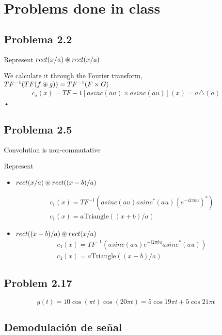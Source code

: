\documentclass[../main/main.tex]{subfiles}
\begin{document}
\section{Problems done in class}


\subsection{Problema 2.2}


Represent $rect(x/a) \circledast rect(x/a)$

We calculate it through the Fourier transform, $TF^{-1}(TF(f\circledast g)) = TF^{-1}(F \times G)$
\begin{align*}
c_{a}(x) = TF-1[asinc(au)\times asinc(au)](x) = a \triangle(a)
\end{align*}•


\subsection{Problema 2.5}

Convolution is non-commutative

Represent

\begin{itemize}
	\item $rect(x/a) \circledast rect((x-b)/a)$


	\begin{align*}
		c_{1}(x) = TF^{-1}\left(asinc(au) asinc^{*}(au) (e^{-i2\pi bu})^{*}\right) \\
		c_{1}(x) = a \textrm{Triangle}((x+b)/a)
	\end{align*}
	\item $rect((x-b)/a) \circledast rect(x/a)$
	\begin{align*}
		c_{1}(x) = TF^{-1}\left(asinc(au) e^{-i2\pi bu} asinc^{*}(au) \right) \\
		c_{1}(x) = a \textrm{Triangle}((x-b)/a)
	\end{align*}


\end{itemize}

\subsection{Problem 2.17}

\begin{equation}
g(t) = 10 \cos (\pi t) \cos (20 \pi t) = 5 \cos 19\pi t + 5\cos 21\pi t
\end{equation}


\subsection{Demodulación de señal}
\end{document}
